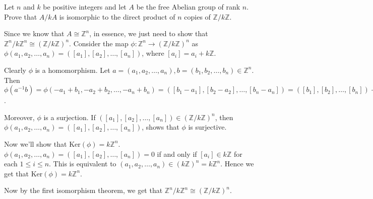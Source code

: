 \documentclass[12pt]{exam}
\theoremstyle{plain} %
\theoremstyle{definition} %
\theoremstyle{remark} %
\begin{document}
\begin{questions}
\begin{solution}
  \end{solution}

  \question
  Let $n$ and $k$ be positive integers and let $A$ be the free Abelian group of rank $n$. Prove that $A/kA$ is isomorphic to the direct product of $n$ copies of $\mathbb{Z}/k \mathbb{Z}$.
  \begin{solution}
  Since we know that $A \cong  \mathbb{Z}^n$, in essence, we just need to show that $\mathbb{Z}^n/ k \mathbb{Z}^n \cong (\mathbb{Z}/ k \mathbb{Z})^n$. Consider the map $\phi: \mathbb{Z}^n \to (\mathbb{Z}/ k \mathbb{Z})^n$ as $\phi(a_1 , a_2 , \ldots , a_n) = ([a_1] , [a_2] , \ldots , [a_n])$, where $[a_i] = a_i + k \mathbb{Z}$.

  Clearly $\phi$ is a homomorphism. Let $a = (a_1 , a_2 , \ldots, a_n), b = (b_1 , b_2 , \ldots , b_n) \in \mathbb{Z}^n$. Then $\phi(a^{-1}b) = \phi(-a_1 + b_1 , -a_2 + b_2 , \ldots , -a_n + b_n) = ([b_1 - a_1], [b_2 - a_2], \ldots, [b_n - a_n]) = ([b_1] , [b_2] , \ldots , [b_n]) - ([a_1] , [a_2] , \ldots , [a_n]) = \phi(b) - \phi(a)$.

  Moreover, $\phi$ is a surjection. If $([a_1] , [a_2] , \ldots , [a_n]) \in (\mathbb{Z}/k \mathbb{Z})^n$, then $\phi(a_1 , a_2 , \ldots , a_n) =([a_1] , [a_2] , \ldots , [a_n])$, shows that $\phi$ is surjective.

  Now we'll show that $\textrm{Ker}(\phi) = k \mathbb{Z}^n$. $\phi(a_1 , a_2 , \ldots , a_n) = ([a_1] , [a_2] , \ldots , [a_n]) = 0$ if and only if $[a_i] \in k \mathbb{Z}$ for each $1 \le i \le n$. This is equivalent to $(a_1 , a_2 , \ldots , a_n) \in (k \mathbb{Z})^n = k \mathbb{Z}^n$. Hence we get that $\textrm{Ker}(\phi) = k \mathbb{Z}^n$. 

  Now by the first isomorphism theorem, we get that $\mathbb{Z}^n/ k \mathbb{Z}^n \cong (\mathbb{Z}/ k \mathbb{Z})^n$.
  \end{solution}



\end{questions}
\printbibliography[heading=bibintoc]
\end{document}
